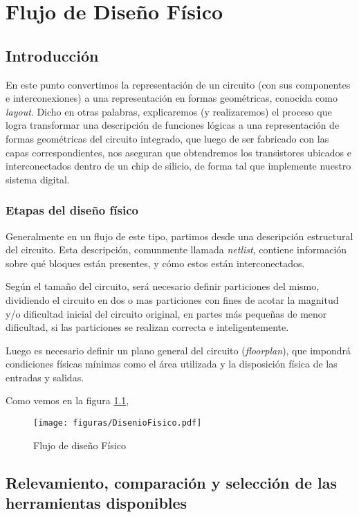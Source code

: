 \chapter{Flujo de Diseño Físico}
\section{Introducción}

En este punto convertimos la representación de un circuito (con sus componentes e interconexiones) a una representación en formas geométricas, conocida como \emph{layout}. Dicho en otras palabras, explicaremos (y realizaremos) el proceso que logra transformar una descripción de funciones lógicas a una representación de formas geométricas del circuito integrado, que luego de ser fabricado con las capas correspondientes, nos aseguran que obtendremos los transistores ubicados e interconectados dentro de un chip de silicio, de forma tal que implemente nuestro sistema digital.

\subsection{Etapas del diseño físico}
Generalmente en un flujo de este tipo, partimos desde una descripción estructural del circuito. Esta descripción, comunmente llamada \emph{netlist}, contiene información sobre qué bloques están presentes, y cómo estos están interconectados.

Según el tamaño del circuito, será necesario definir particiones del mismo, dividiendo el circuito en dos o mas particiones con fines de acotar la magnitud y/o dificultad inicial del circuito original, en partes más pequeñas de menor dificultad, si las particiones se realizan correcta e inteligentemente. 

Luego es necesario definir un plano general del circuito (\emph{floorplan}), que impondrá condiciones físicas mínimas como el área utilizada y la disposición física de las entradas y salidas.   

Como vemos en la figura \ref{fig:diseñoFísico}, 

\begin{figure}[h]
\centering
\texttt{[image: figuras/DisenioFisico.pdf]}
  \caption{Flujo de diseño Físico}
  \label{fig:diseñoFísico}
\end{figure}


\section{Relevamiento, comparación y selección de las herramientas disponibles}
